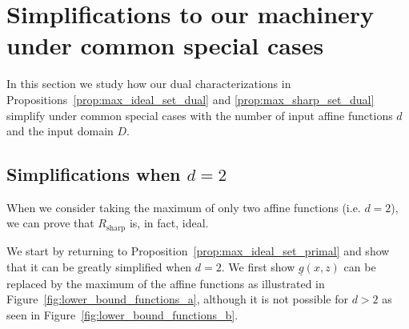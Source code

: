 \documentclass[smallextended]{svjour3}
\newcommand{\Rsharp}{R_{\operatorname{sharp}}}
\newcommand{\Smax}{S_{\operatorname{max}}}
\newcommand{\ubar}[1]{\underline{#1}}
\begin{document}
\section{Simplifications to our machinery under common special cases} \label{sec:simplifications}

In this section we study how our dual characterizations in Propositions~\ref{prop:max_ideal_set_dual} and \ref{prop:max_sharp_set_dual} simplify under common special cases with the number of input affine functions $d$ and the input domain $D$.

\subsection{Simplifications when $d=2$} \label{sec:d-2}

When we consider taking the maximum of only two affine functions (i.e. $d=2$), we can prove that $\Rsharp$ is, in fact, ideal.

We start by returning to Proposition~\ref{prop:max_ideal_set_primal} and show that it can be greatly simplified when $d = 2$. We first show $\ubar{g}(x,z)$ can be replaced by the maximum of the affine functions as illustrated in Figure~\ref{fig:lower_bound_functions_a}, although it is not possible for $d > 2$ as seen in Figure~\ref{fig:lower_bound_functions_b}.
\end{document}
